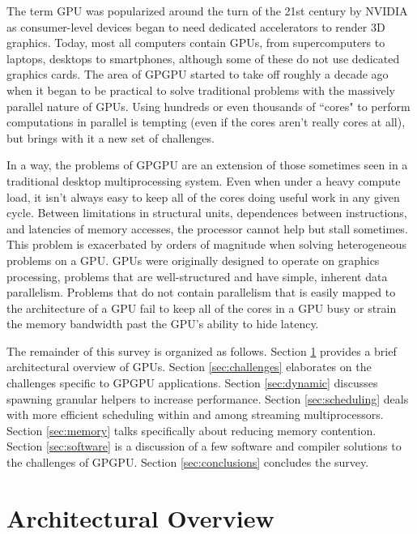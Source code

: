 \documentclass[prodmode,acmtecs]{acmsmall} %
\begin{document}
The term GPU was popularized around the turn of the 21st century by NVIDIA as
consumer-level devices began to need dedicated accelerators to render 3D
graphics. Today, most all computers contain GPUs, from supercomputers to
laptops, desktops to smartphones, although some of these do not use dedicated
graphics cards. The area of GPGPU started to take off roughly a decade ago when
it began to be practical to solve traditional problems with the massively
parallel nature of GPUs. Using hundreds or even thousands of ``cores" to perform
computations in parallel is tempting (even if the cores aren't really cores at
all), but brings with it a new set of challenges.

In a way, the problems of GPGPU are an extension of those sometimes seen in a
traditional desktop multiprocessing system. Even when under a heavy compute
load, it isn't always easy to keep all of the cores doing useful work in any
given cycle. Between limitations in structural units, dependences between
instructions, and latencies of memory accesses, the processor cannot help but
stall sometimes. This problem is exacerbated by orders of magnitude when solving
heterogeneous problems on a GPU. GPUs were originally designed to operate on
graphics processing, problems that are well-structured and have simple, inherent
data parallelism. Problems that do not contain parallelism that is easily mapped
to the architecture of a GPU fail to keep all of the cores in a GPU busy or
strain the memory bandwidth past the GPU's ability to hide latency.

The remainder of this survey is organized as follows. Section
\ref{sec:architecture} provides a brief architectural overview of GPUs. Section
\ref{sec:challenges} elaborates on the challenges specific to GPGPU
applications. Section \ref{sec:dynamic} discusses spawning granular helpers to
increase performance. Section \ref{sec:scheduling} deals with more efficient
scheduling within and among streaming multiprocessors. Section \ref{sec:memory}
talks specifically about reducing memory contention. Section \ref{sec:software}
is a discussion of a few software and compiler solutions to the challenges of
GPGPU. Section
\ref{sec:conclusions} concludes the survey.

\section{Architectural Overview} \label{sec:architecture}
\end{document}

